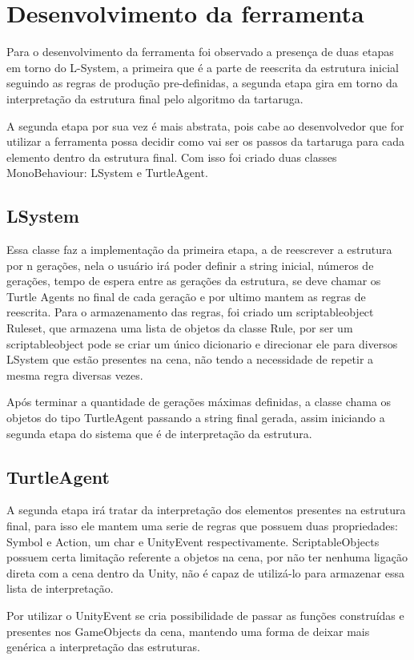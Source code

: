 \section{Desenvolvimento da ferramenta}

Para o desenvolvimento da ferramenta foi observado a presença de duas etapas em torno do L-System, a primeira que é a parte de reescrita da estrutura inicial seguindo as regras de produção pre-definidas, a segunda etapa gira em torno da interpretação da estrutura final pelo algoritmo da tartaruga.

A segunda etapa por sua vez é mais abstrata, pois cabe ao desenvolvedor que for utilizar a ferramenta possa decidir como vai ser os passos da tartaruga para cada elemento dentro da estrutura final. Com isso foi criado duas classes MonoBehaviour: LSystem e TurtleAgent.

\subsection{LSystem}
Essa classe faz a implementação da primeira etapa, a de reescrever a estrutura por n gerações, nela o usuário irá poder definir a string inicial, números de gerações, tempo de espera entre as gerações da estrutura, se deve chamar os Turtle Agents no final de cada geração e por ultimo mantem as regras de reescrita. Para o armazenamento das regras, foi criado um scriptableobject Ruleset, que armazena uma lista de objetos da classe Rule, por ser um scriptableobject pode se criar um único dicionario e direcionar ele para diversos LSystem que estão presentes na cena, não tendo a necessidade de repetir a mesma regra diversas vezes.

Após terminar a quantidade de gerações máximas definidas, a classe chama os objetos do tipo TurtleAgent passando a string final gerada, assim iniciando a segunda etapa do sistema que é de interpretação da estrutura.

\subsection{TurtleAgent}
A segunda etapa irá tratar da interpretação dos elementos presentes na estrutura final, para isso ele mantem uma serie de regras que possuem duas propriedades: Symbol e Action, um char e UnityEvent respectivamente. ScriptableObjects possuem certa limitação referente a objetos na cena, por não ter nenhuma ligação direta com a cena dentro da Unity, não é capaz de utilizá-lo para armazenar essa lista de interpretação.

Por utilizar o UnityEvent se cria possibilidade de passar as funções construídas e presentes nos GameObjects da cena, mantendo uma forma de deixar mais genérica a interpretação das estruturas.